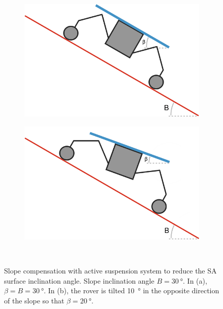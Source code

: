 \documentclass[twocolumn,letterpaper]{IEEEAerospaceCLS}  %
\newlength{\subfigureWidth}
\newlength{\graphicsHeight}
\begin{document}
\begin{figure}[h]
\captionsetup[subfigure]{justification=centering}
  \centering
  \begin{subfigure}[t]{\subfigureWidth}
    \centering
    \includegraphics[height=\graphicsHeight]{figures/images/stick-rover-beta-large.png}
    \label{fig:sub:rover-on-slope-beta-large}
  \end{subfigure}\hfill
  \begin{subfigure}[t]{\subfigureWidth}
    \centering
    \includegraphics[height=\graphicsHeight]{figures/images/stick-rover-beta-small.png}
    \label{fig:sub:rover-on-slope-beta-small}
  \end{subfigure}\\[0.8ex]
  \caption{Slope compensation with active suspension system to reduce the \ac{SA} surface inclination angle. Slope inclination angle $B = \SI{30}{\degree}$. In (a), $\beta = B = \SI{30}{\degree}$. In (b), the rover is tilted \SI{10}{\degree} in the opposite direction of the slope so that $\beta = \SI{20}{\degree}$.}
  \label{fig:sub:rover-on-slope-beta}
\end{figure}
\end{document}
